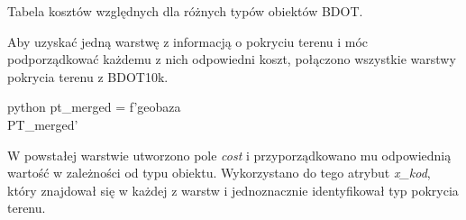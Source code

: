 \documentclass{article}
\begin{document}
\begin{table}[ht]
    \caption{Tabela kosztów względnych dla różnych typów obiektów BDOT.}
    \label{tab:bdot_costs}
\end{table}
\vspace{10pt}

Aby uzyskać jedną warstwę z informacją o pokryciu terenu i móc podporządkować każdemu z nich odpowiedni koszt, połączono wszystkie warstwy pokrycia terenu z BDOT10k.
\vspace{5pt}

\begin{mintedbox}{python}
pt_merged = f'{geobaza}\\PT_merged'
\end{mintedbox}

W powstałej warstwie utworzono pole \textit{cost} i przyporządkowano mu odpowiednią wartość w zależności od typu obiektu. Wykorzystano do tego atrybut \textit{x\_kod}, który znajdował się w każdej z warstw i jednoznacznie identyfikował typ pokrycia terenu.
\vspace{5pt}
\end{document}
